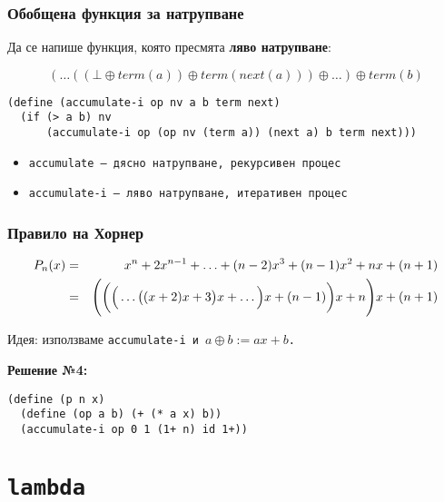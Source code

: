 \documentclass{beamer}
\begin{document}
\begin{frame}[fragile]
  \frametitle{Обобщена функция за натрупване}

  Да се напише функция, която пресмята \textbf{ляво натрупване}:

  \begin{equation*}
    (\ldots((\bot \oplus term(a)) \oplus term(next(a))) \oplus \ldots) \oplus term(b)
  \end{equation*}

  \pause
  \small
\begin{verbatim}
(define (accumulate-i op nv a b term next)
  (if (> a b) nv
      (accumulate-i op (op nv (term a)) (next a) b term next)))
\end{verbatim}

  \pause
  \begin{itemize}
  \item \tt{accumulate} --- дясно натрупване, рекурсивен процес
  \item \tt{accumulate-i} --- ляво натрупване, итеративен процес
  \end{itemize}
\end{frame}

\begin{frame}[fragile]
  \frametitle{Правило на Хорнер}

  \begin{eqnarray*}
    P_n(x) &=& x^n + 2x^{n-1} + \ldots + (n-2)x^3 + (n-1)x^2 + nx + (n+1)\\
    &=& \Bigg(\bigg(\Big(\ldots\big((x + 2)x + 3\big)x + \ldots\Big)x + (n-1)\bigg)x + n\Bigg)x + (n+1)
  \end{eqnarray*}

  Идея: използваме \tt{accumulate-i} и $a \oplus b := ax + b$.
  \vspace{1em}
  \pause

  \textbf{Решение №4:}

\begin{verbatim}
(define (p n x)
  (define (op a b) (+ (* a x) b))
  (accumulate-i op 0 1 (1+ n) id 1+))
\end{verbatim}
\end{frame}

\section{\tt{lambda}}
\end{document}
